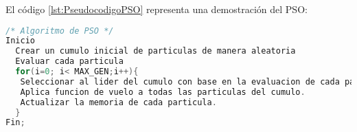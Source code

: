 El código \ref{lst:PseudocodigoPSO} representa una demostración del PSO:\\

\begin{lstlisting}[language=C++, caption=Pseudocódigo PSO, label=lst:PseudocodigoPSO]
/* Algoritmo de PSO */
Inicio
  Crear un cumulo inicial de particulas de manera aleatoria
  Evaluar cada particula
  for(i=0; i< MAX_GEN;i++){
   Seleccionar al lider del cumulo con base en la evaluacion de cada particula.
   Aplica funcion de vuelo a todas las particulas del cumulo.
   Actualizar la memoria de cada particula.
  }
Fin;

\end{lstlisting}